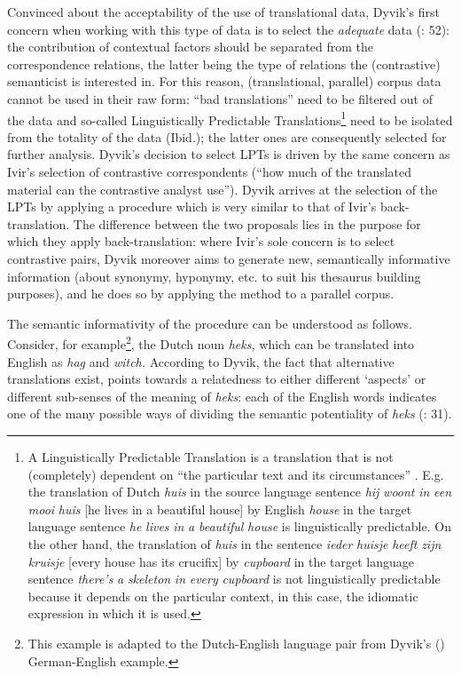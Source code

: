 Convinced about the acceptability of the use of translational data, Dyvik’s first concern when working with this type of data is to select the \textit{adequate} data (\citealt{johansson_translational_1998}: 52): the contribution of contextual factors should be separated from the correspondence relations, the latter being the type of relations the (contrastive) semanticist is interested in. For this reason, (translational, parallel) corpus data cannot be used in their raw form: “bad translations” need to be filtered out of the data and so-called Linguistically Predictable Translations\footnote{A Linguistically Predictable Translation is a translation that is not (completely) dependent on “the particular text and its circumstances” \citep{johansson_translational_1998}. E.g. the translation of Dutch \textit{huis} in the source language sentence \textit{hij} \textit{woont} \textit{in} \textit{een} \textit{mooi} \textit{huis} [he lives in a beautiful house] by English \textit{house} in the target language sentence \textit{he} \textit{lives} \textit{in} \textit{a} \textit{beautiful} \textit{house} is linguistically predictable. On the other hand, the translation of \textit{huis} in the sentence \textit{ieder} \textit{huisje} \textit{heeft} \textit{zijn} \textit{kruisje} [every house has its crucifix] by \textit{cupboard} in the target language sentence \textit{there’s} \textit{a} \textit{skeleton} \textit{in} \textit{every} \textit{cupboard} is not linguistically predictable because it depends on the particular context, in this case, the idiomatic expression in which it is used.} need to be isolated from the totality of the data (Ibid.); the latter ones are consequently selected for further analysis. Dyvik’s decision to select LPTs is driven by the same concern as Ivir’s selection of contrastive correspondents (“how much of the translated material can the contrastive analyst use”). Dyvik arrives at the selection of the LPTs by applying a procedure which is very similar to that of Ivir’s back-translation. The difference between the two proposals lies in the purpose for which they apply back-translation: where Ivir’s sole concern is to select contrastive pairs, Dyvik moreover aims to generate new, semantically informative information (about synonymy, hyponymy, etc. to suit his thesaurus building purposes), and he does so by applying the method to a parallel corpus.



The semantic informativity of the procedure can be understood as follows. Consider, for example\footnote{This example is adapted to the Dutch-English language pair from Dyvik’s (\citeyear[29-31]{langemets_translations_2005}) German-English example.}, the Dutch noun \textit{heks,} which can be translated into English as \textit{hag} and \textit{witch.} According to Dyvik, the fact that alternative translations exist, points towards a relatedness to either different ‘aspects’ or different sub-senses of the meaning of \textit{heks}: each of the English words indicates one of the many possible ways of dividing the semantic potentiality of \textit{heks} (\citealt{langemets_translations_2005}: 31).


